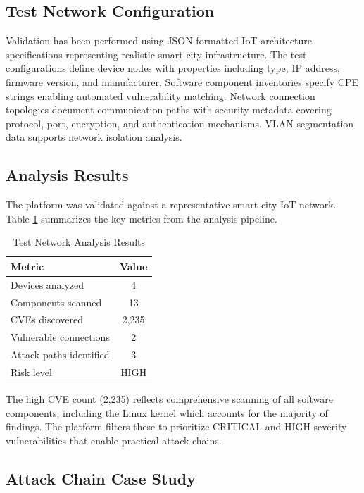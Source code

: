 \documentclass[11pt,a4paper]{article}
\begin{document}
\subsection{Test Network Configuration}

Validation has been performed using JSON-formatted IoT architecture specifications representing realistic smart city infrastructure. The test configurations define device nodes with properties including type, IP address, firmware version, and manufacturer. Software component inventories specify CPE strings enabling automated vulnerability matching. Network connection topologies document communication paths with security metadata covering protocol, port, encryption, and authentication mechanisms. VLAN segmentation data supports network isolation analysis.

\newpage
\subsection{Analysis Results}

The platform was validated against a representative smart city IoT network. Table \ref{tab:results} summarizes the key metrics from the analysis pipeline.

\begin{table}[H]
\centering
\begin{tabular}{|l|c|}
\hline
\textbf{Metric} & \textbf{Value} \\
\hline
Devices analyzed & 4 \\
Components scanned & 13 \\
CVEs discovered & 2,235 \\
Vulnerable connections & 2 \\
Attack paths identified & 3 \\
Risk level & HIGH \\
\hline
\end{tabular}
\caption{Test Network Analysis Results}
\label{tab:results}
\end{table}

The high CVE count (2,235) reflects comprehensive scanning of all software components, including the Linux kernel which accounts for the majority of findings. The platform filters these to prioritize CRITICAL and HIGH severity vulnerabilities that enable practical attack chains.

\subsection{Attack Chain Case Study}
\end{document}

